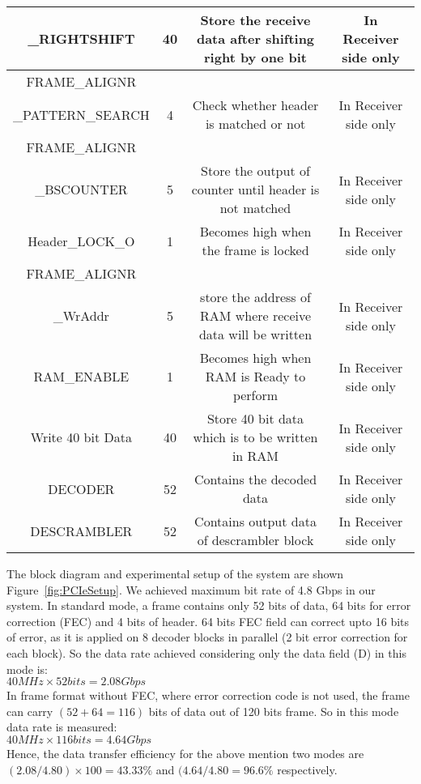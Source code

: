 \documentclass[10pt, conference, compsocconf]{IEEEtran}
\begin{document}
\begin{table*}[htb]
\begin{center}
{\begin{tabular}  {|c|c|c|c|}
\_RIGHTSHIFT  &40 & Store the receive data after shifting right by one bit & In Receiver side only\\
\hline
FRAME\_ALIGNR &&&
\\
\_PATTERN\_SEARCH  &4 & Check whether header is matched or not & In Receiver side only\\
\hline 
FRAME\_ALIGNR &&&
\\
\_BSCOUNTER  & 5& Store the output of counter until header is not matched & In Receiver side only\\
\hline 
Header\_LOCK\_O  & 1& Becomes high when the frame is locked & In Receiver side only\\
\hline
FRAME\_ALIGNR &&&
\\
\_WrAddr  & 5 & store the address of RAM where receive data will be written & In Receiver side only\\
\hline
RAM\_ENABLE  &1 & Becomes high when RAM is Ready to perform & In Receiver side only\\
\hline
Write 40 bit Data  &40 & Store 40 bit data which is to be written in RAM &  In Receiver side only\\
\hline
DECODER  & 52& Contains the decoded data & In Receiver side only\\
\hline
DESCRAMBLER  & 52& Contains output data of descrambler block & In Receiver side only\\  
\hline
\end{tabular}}
\vspace{-10 pt}
\label{table:SignalName}
\end{center}
\end{table*}
The block diagram and experimental setup of the system are shown Figure~\ref{fig:PCIeSetup}. We achieved maximum bit rate of 4.8 Gbps in our system. In standard mode, a frame contains only 52 bits of data, 64 bits for error correction (FEC) and 4 bits of header. 64 bits  FEC field can correct upto 16 bits of error, as it is applied on 8 decoder blocks in parallel (2 bit error correction for each block). So the data rate achieved considering only the data field (D) in this mode is: \\
$ 40 MHz \times 52 bits = 2.08 Gbps$ \\
In frame format without FEC, where error correction code is not used, the frame can carry $(52+64=116)$ bits of data out of 120 bits frame.
So in this mode data rate is measured: \\
$40 MHz \times 116 bits = 4.64 Gbps$ \\
Hence, the data transfer efficiency for the above mention two modes are $(2.08/4.80)\times 100 = 43.33\%$ and $(4.64/4.80 = 96.6\% $ respectively. 
\end{document}
